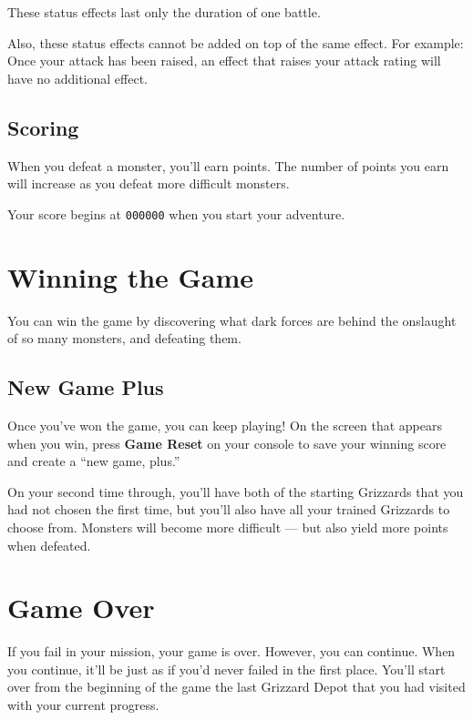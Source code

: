 \documentclass[10pt,twocolumn,openany,article]{memoir}
\begin{document}
\begin{description}
These status effects last only the duration of one battle.

Also, these  status effects cannot be  added on top of  the same effect.
For example:  Once your attack  has been  raised, an effect  that raises
your attack rating will have no additional effect.

\subsection{Scoring}

When you  defeat a monster, you'll  earn points. The number  of points
you earn will increase as you defeat more difficult monsters.

Your score begins at \texttt{000000} when you start your adventure.

\section{Winning the Game}

You can  win the  game by  discovering what dark  forces are  behind the
onslaught of so many monsters, and defeating them.

\subsection*{New Game Plus}\label{sec:NewGamePlus}

Once  you've won  the game,  you can  keep playing!  On the  screen that
appears when you win, press \textbf{Game  Reset} on your console to save
your winning score and create a ``new game, plus.''

On your second time through, you'll  have both of the starting Grizzards
that you had  not chosen the first  time, but you'll also  have all your
trained Grizzards to choose from.  Monsters will become more difficult —
but also yield more points when defeated.

\section{Game Over}

If  you fail  in  your mission,  your  game is  over.  However, you  can
continue. When you  continue, it'll be just as if  you'd never failed in
the first place. You'll start  over from \ifdefined\NOSAVE the beginning
of the game \else the last Grizzard  Depot that you had visited \fi with
your current progress.


\end{description}
\end{document}
